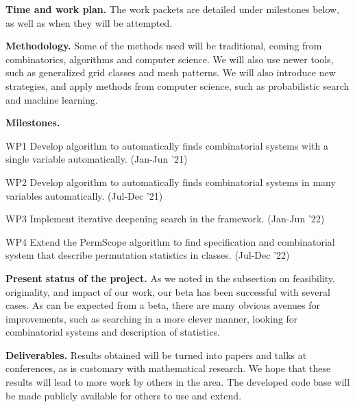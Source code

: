 \documentclass{rannis}
\newcommand{\tilealg}{\textsf{PermScope}}
\newcommand{\yearofappls}{21}
\newcommand{\yearofapplsp}{22}
\theoremstyle{definition}
\newenvironment{packed_enum}{
\begin{enumerate}
  \setlength{\itemsep}{-1pt}
  \setlength{\parskip}{-1pt}
  \setlength{\parsep}{-1pt}
}{\end{enumerate}}
\begin{document}
\noindent \textbf{Time and work plan.}
The work packets are detailed under milestones below, as well as when they will
be attempted.

\noindent\textbf{Methodology.}
Some of the methods used will be traditional, coming from combinatorics, algorithms and
computer science. We will also use newer tools, such as generalized grid classes
and mesh patterns. We will also introduce new strategies, and
apply methods from computer science, such as probabilistic search and machine
learning.

\noindent \textbf{Milestones.}
\begin{packed_enum}

\item[WP1] Develop algorithm to automatically finds combinatorial systems with
    a single variable automatically.  (Jan-Jun '\yearofappls)
\item[WP2] Develop algorithm to automatically finds combinatorial systems
    in many variables automatically.  (Jul-Dec '\yearofappls)
\item[WP3] Implement iterative deepening search in the framework. (Jan-Jun '\yearofapplsp)
\item[WP4] Extend the \tilealg{} algorithm to find specification and
    combinatorial system that describe permutation statistics in classes.
    (Jul-Dec '\yearofapplsp)

\end{packed_enum}

\noindent\textbf{Present status of the project.} As we noted in the subsection on
feasibility, originality, and impact of our work, our beta has been successful
with several cases. As can be expected from a beta, there are many
obvious avenues for improvements, such as
searching in a more clever manner, looking for combinatorial systems and
description of statistics.

\noindent\textbf{Deliverables.}
Results obtained will be turned into papers and talks at conferences, as is
customary with mathematical research.  We hope that these results will lead to
more work by others in the area. The developed code base will be made publicly
available for others to use and extend.
\\
\end{document}
